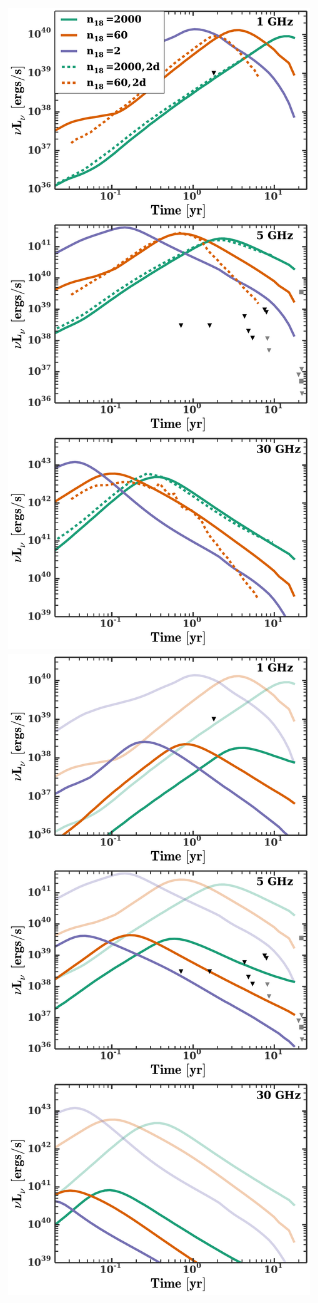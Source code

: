 \documentclass[usenatbib,fleqn]{mnras}
\begin{document}
\begin{figure} 
  \includegraphics[width=8cm]{lightcurves.pdf}
  \includegraphics[width=8cm]{lightcurves_en.pdf}

\end{figure}
\end{document}
